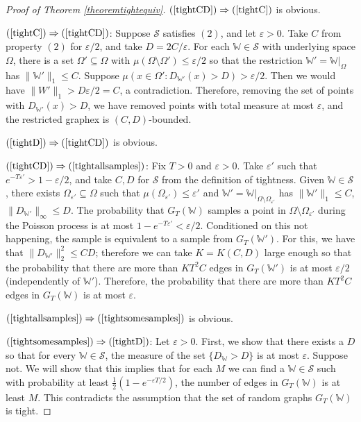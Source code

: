 \documentclass{amsart}
\numberwithin{equation}{section}
\numberwithin{figure}{section}
\theoremstyle{definition}
\theoremstyle{remark}
\newcommand{\eps}{\varepsilon}
\newcommand{\cW}{\mathbb{W}}
\newcommand{\cS}{\mathcal{S}}
\begin{document}
\begin{proof}[Proof of Theorem \ref{theoremtightequiv}]
$(\ref{tightCD}) \Rightarrow (\ref{tightC})$ is obvious.

$(\ref{tightC}) \Rightarrow (\ref{tightCD})$: Suppose $\cS$ satisfies $(2)$,
and let $\varepsilon>0$. Take $C$ from property $(2)$ for $\varepsilon/2$,
and take $D=2C/\varepsilon$. For each $\cW \in \cS$ with underlying space
$\Omega$, there is a set $\Omega' \subseteq \Omega$ with $\mu(\Omega
\setminus \Omega') \le \varepsilon/2$ so that the restriction
$\cW'=\cW|_{\Omega}$ has $\|\cW'\|_1 \le C$. Suppose $\mu(x \in
\Omega':D_{\cW'}(x)>D)
>\varepsilon/2$. Then we would have $\|W'\|_1 >D \varepsilon/2 =C$, a
contradiction. Therefore, removing the set of points with $D_{\cW'}(x)>D$, we
have removed points with total measure at most $\varepsilon$, and the
restricted graphex is $(C,D)$-bounded.

$(\ref{tightD}) \Rightarrow (\ref{tightCD})$ is obvious.

$(\ref{tightCD}) \Rightarrow (\ref{tightallsamples})$: Fix $T>0$ and
$\varepsilon>0$. Take $\varepsilon'$ such that
$e^{-T\varepsilon'}>1-\varepsilon/2$, and take $C,D$ for $\cS$ from the
definition of tightness. Given $\cW \in \cS$, there exists
$\Omega_{\varepsilon'} \subseteq \Omega$ such that
$\mu(\Omega_{\varepsilon'}) \le \varepsilon'$ and $\cW'=\cW|_{\Omega
\setminus \Omega_{\varepsilon'}}$ has $\|\cW'\|_1 \le C$,
$\|D_{\cW'}\|_\infty \le D$. The probability that $G_T(\cW)$ samples a point
in $\Omega \setminus {\Omega_{\varepsilon'}}$ during the Poisson process is
at most $1-e^{-T\varepsilon'}<\varepsilon/2$. Conditioned on this not
happening, the sample is equivalent to a sample from $G_T(\cW')$. For this,
we have that $\|D_{\cW'}\|_2^2 \le CD$; therefore we can take $K=K(C,D)$
large enough so that the probability that there are more than $KT^2C$ edges
in $G_T(\cW')$ is at most $\varepsilon/2$ (independently of $\cW'$).
Therefore, the probability that there are more than $KT^2C$ edges in
$G_T(\cW)$ is at most $\varepsilon$.

$(\ref{tightallsamples}) \Rightarrow (\ref{tightsomesamples})$ is obvious.

$(\ref{tightsomesamples}) \Rightarrow (\ref{tightD})$: Let $\varepsilon>0$.
First, we show that there exists a $D$ so that for every $\cW \in \cS$, the
measure of the set $\{D_\cW>D\}$ is at most $\eps$. Suppose not. We will show
that this implies that for each $M$ we can find a $\cW\in \cS$ such with
probability at least $\frac 12(1-e^{-\varepsilon T/2})$, the number of edges
in $G_T(\cW)$ is at least $M$. This contradicts the assumption that the set
of random graphs $G_T(\cW)$ is tight.


\end{proof}
\end{document}
